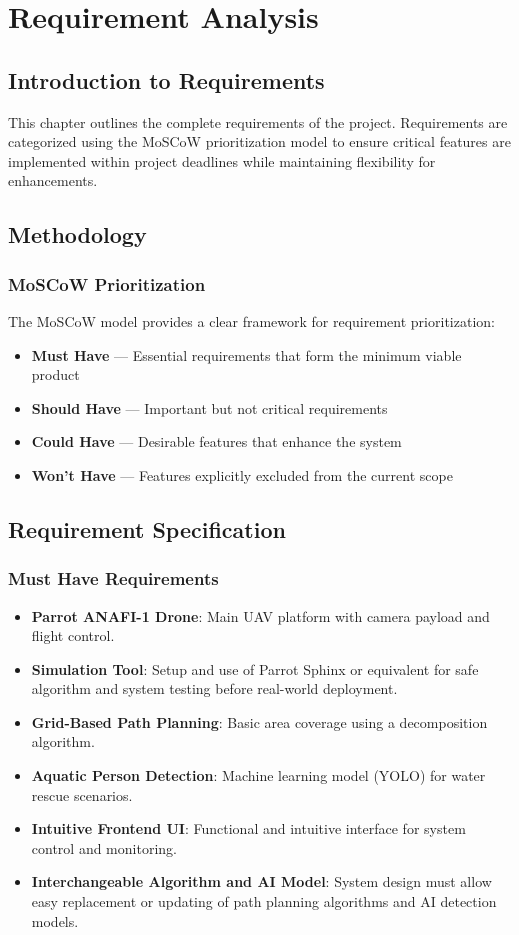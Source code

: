 \chapter{Requirement Analysis}\label{ch:requirement-analysis}

\section{Introduction to Requirements}
This chapter outlines the complete requirements of the project. Requirements are categorized using the MoSCoW prioritization model to ensure critical features are implemented within project deadlines while maintaining flexibility for enhancements.

\section{Methodology}
\subsection{MoSCoW Prioritization}
The MoSCoW model provides a clear framework for requirement prioritization:
\begin{itemize}
    \item \textbf{Must Have} — Essential requirements that form the minimum viable product
    \item \textbf{Should Have} — Important but not critical requirements
    \item \textbf{Could Have} — Desirable features that enhance the system
    \item \textbf{Won't Have} — Features explicitly excluded from the current scope
\end{itemize}

\section{Requirement Specification}

\subsection{Must Have Requirements}
\begin{itemize}
    \item \textbf{Parrot ANAFI-1 Drone}: Main UAV platform with camera payload and flight control.
    \item \textbf{Simulation Tool}: Setup and use of Parrot Sphinx or equivalent for safe algorithm and system testing before real-world deployment.
    \item \textbf{Grid-Based Path Planning}: Basic area coverage using a decomposition algorithm.
    \item \textbf{Aquatic Person Detection}: Machine learning model (YOLO) for water rescue scenarios.
    \item \textbf{Intuitive Frontend UI}: Functional and intuitive interface for system control and monitoring.
    \item \textbf{Interchangeable Algorithm and AI Model}: System design must allow easy replacement or updating of path planning algorithms and AI detection models.
\end{itemize}


